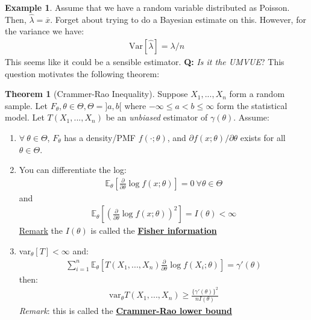 \documentclass[11pt]{scrartcl}
\theoremstyle{definition}
\newtheorem{theorem}{Theorem}
\newtheorem{ex}{Example}
\theoremstyle{remark}
\newcommand{\dfn}[1]{\textbf{\underline{#1}}}
\newcommand{\EXth}[1]{\mathbb{E}_\theta \left[ #1 \right]}
\begin{document}
{\begin{ex} 
Assume that we have a random variable distributed as Poisson. Then, $\hat{\lambda} = \overline{x}$. Forget about trying to do a Bayesian estimate on this. However, for the variance we have: 
	\begin{align*}
		\text{Var}[\hat{\lambda}] = \lambda / n 
	\end{align*}
	This seems like it could be a sensible estimator. \textbf{Q:} \emph{Is it the UMVUE}? This question motivates the following theorem: 
\end{ex}

\begin{theorem}[Crammer-Rao Inequality]
	Suppose $X_1, ..., X_n$ form a random sample. Let $F_\theta, \theta \in \Theta, \Theta = ]a,b[$ where $-\infty \leq a < b \leq \infty$ form the statistical model. Let $T(X_1, ..., X_n)$ be an \emph{unbiased} estimator of $\gamma(\theta)$. Assume: 
	\begin{enumerate}[noitemsep]
		\item $\forall\ \theta \in \Theta$, $F_\theta$ has a density/PMF $f(\cdot; \theta)$, and $\partial f(x; \theta) / \partial \theta$ exists for all $\theta \in \Theta$. 
		\item You can differentiate the log: 
		\begin{align*}
			\EXth{\frac{\partial}{\partial \theta} \log f(x; \theta)} = 0\ \forall \theta \in \Theta 	
		\end{align*}
		and 
		\begin{align*}
			\EXth{ \left(  \frac{\partial}{\partial \theta} \log f(x; \theta) \right)^2 } = I(\theta) < \infty 	
		\end{align*}
		\underline{Remark} the $I(\theta)$ is called the \dfn{Fisher information}
		\item var$_\theta[T] < \infty$ and: 
		\begin{align*}
			\sum_{i=1}^n \EXth{T(X_1, ..., X_n) \frac{\partial}{\partial \theta} \log f(X_i; \theta)} = \gamma'(\theta)  
		\end{align*}
		then: 
		\begin{align*}	
			\text{var}_\theta T(X_1, ..., X_n) \geq \frac{\{ \gamma'(\theta) \}^2}{nI(\theta)}	
		\end{align*}
		\emph{Remark}: this is called the \dfn{Crammer-Rao lower bound} 
	\end{enumerate}
\end{theorem}

}
\end{document}
